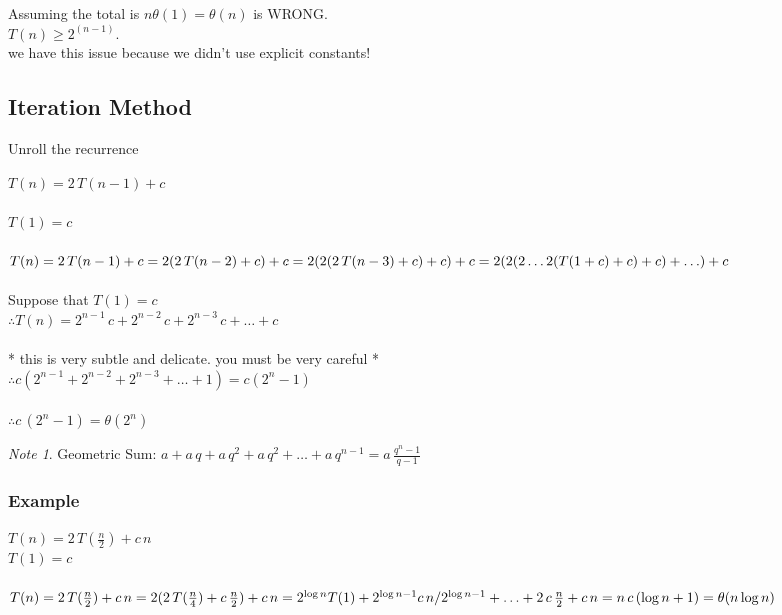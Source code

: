 \documentclass{article}
\theoremstyle{definition}
\theoremstyle{remark}
\newtheorem{note}{Note}[section]
\theoremstyle{plain}
\begin{document}
Assuming the total is $n \theta(1) = \theta(n)$ is WRONG.\\
$T(n) \ge 2^{(n-1)}$. \\  we have this issue because we didn't use explicit constants!

\subsection{Iteration Method}
Unroll the recurrence

$T(n) = 2\,T(n-1) + c$\\\\
$T(1) = c$\\\\

$T(n) = 2\,T(n-1) + c \\= 2(2\,T(n-2)+c) +c\\
	= 2(2(2\,T(n-3)+c)+c)+c\\
	=2(2(2 \ldots 2(T(1 +c) +c) + c) +\ldots ) + c$\\\\

Suppose that $T(1) = c$\\
$\therefore T(n) = 2^{n-1}\,c + 2^{n-2}\,c + 2^{n-3} \,c + \ldots + c$\\\\
* this is very subtle and delicate. you must be very careful *\\
$\therefore c ( 2^{n-1} + 2^{n-2} + 2^{n-3} + \ldots + 1) = c (2^n -1)$\\\\
$\therefore c\,(2^n -1) = \theta(2^n)$\\
\begin{note}
Geometric Sum: $a + a\,q + a\,q^2 + a\,q^2 + \ldots + a\,q^{n-1} = a\, \frac{q^n -1}{q-1}$
\end{note}

\subsubsection{Example}
$T(n) = 2\, T(\frac{n}{2}) + c\,n$\\
$T(1) = c$\\\\

$T(n) = 2 \, T(\frac{n}{2}) + c\,n = 2 (2 \, T(\frac{n}{4}) + c\,\frac{n}{2}) + c\,n\\
= 2^{\log n} T(1) + 2^{\log {n-1}} c\,n / 2^{\log {n-1}} + \ldots + 2 \, c\, \frac{n}{2} + c \, n\\
= n\,c\,(\log n + 1) = \theta(n \log n)$ 
\end{document}
